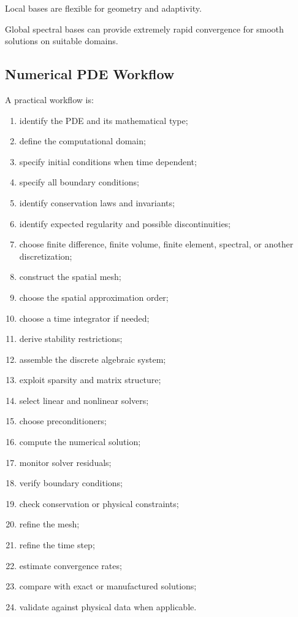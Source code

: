 Local bases are flexible for geometry and adaptivity.

Global spectral bases can provide extremely rapid convergence for smooth
solutions on suitable domains.

\subsection{Numerical PDE Workflow}
\label{subsec:numerical-pde-workflow}

A practical workflow is:

\begin{enumerate}
    \item identify the PDE and its mathematical type;
    \item define the computational domain;
    \item specify initial conditions when time dependent;
    \item specify all boundary conditions;
    \item identify conservation laws and invariants;
    \item identify expected regularity and possible discontinuities;
    \item choose finite difference, finite volume, finite element, spectral,
          or another discretization;
    \item construct the spatial mesh;
    \item choose the spatial approximation order;
    \item choose a time integrator if needed;
    \item derive stability restrictions;
    \item assemble the discrete algebraic system;
    \item exploit sparsity and matrix structure;
    \item select linear and nonlinear solvers;
    \item choose preconditioners;
    \item compute the numerical solution;
    \item monitor solver residuals;
    \item verify boundary conditions;
    \item check conservation or physical constraints;
    \item refine the mesh;
    \item refine the time step;
    \item estimate convergence rates;
    \item compare with exact or manufactured solutions;
    \item validate against physical data when applicable.
\end{enumerate}

